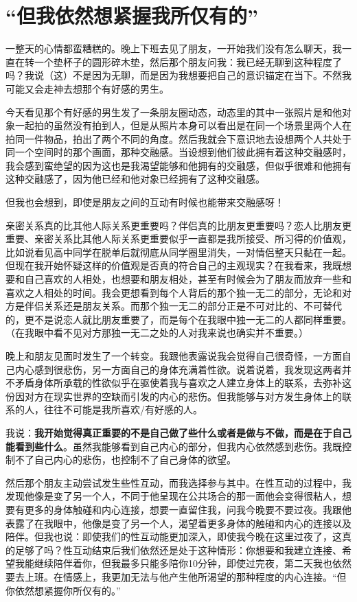 \chapter{“但我​依然想紧握我所仅有的”}






一整天的心情都蛮糟糕的。晚上下班去见了朋友，一开始我们没有怎么聊天，我一直在转一个垫杯子的圆形碎木垫，然后那个朋友问我：我已经无聊到这种程度了吗？我说（这）不是因为无聊，而是因为我想要把自己的意识锚定在当下。不然我可能又会走神去想那个有好感的男生。

今天看见那个有好感的男生发了一条朋友圈动态，动态里的其中一张照片是和他对象一起拍的\pozhehao{}虽然没有拍到人，但是从照片本身可以看出是在同一个场景里两个人在拍同一件物品，拍出了两个不同的角度。然后我就会下意识地去设想两个人共处于同一个空间时的那个画面，那种交融感。当设想到他们彼此拥有着这种交融感时，我会感到蛮绝望的\pozhehao{}因为这也是我渴望能够和他拥有的交融感，但似乎很难和他拥有这种交融感了，因为他已经和他对象已经拥有了这种交融感。

但我也会想到，即使是朋友之间的互动有时候也能带来交融感呀！

亲密关系真的比其他人际关系更重要吗？伴侣真的比朋友更重要吗？恋人比朋友更重要、亲密关系比其他人际关系更重要似乎一直都是我所接受、所习得的价值观，比如说看见高中同学在脱单后就彻底从同学圈里消失，一对情侣整天只黏在一起。但现在我开始怀疑这样的价值观是否真的符合自己的主观现实？在我看来，我既想要和自己喜欢的人相处，也想要和朋友相处，甚至有时候会为了朋友而放弃一些和喜欢之人相处的时间。我会更想看到每个人背后的那个独一无二的部分，无论和对方是伴侣关系还是朋友关系。而那个独一无二的部分正是不可对比的、不可替代的，更不是说恋人就比朋友重要了，而是每个在我眼中独一无二的人都同样重要。（在我眼中看不见对方那独一无二之处的人对我来说也确实并不重要。）

晚上和朋友见面时发生了一个转变。我跟他表露说我会觉得自己很奇怪，一方面自己内心感到很悲伤，另一方面自己的身体充满着性欲。说着说着，我发现这两者并不矛盾\pozhehao{}身体所承载的性欲似乎在驱使着我与喜欢之人建立身体上的联系，去弥补这份因对方在现实世界的空缺而引发的内心的悲伤。但我能够与对方发生身体上的联系的人，往往不可能是我所喜欢/有好感的人。

我说：\textbf{我开始觉得真正重要的不是自己做了些什么或者是做与不做，而是在于自己能看到些什么}。虽然我能够看到自己内心的部分，但我内心依然感到悲伤。我既控制不了自己内心的悲伤，也控制不了自己身体的欲望。

然后那个朋友主动尝试发生些性互动，而我选择参与其中。在性互动的过程中，我发现他像是变了另一个人，不同于他呈现在公共场合的那一面\pozhehao{}他会变得很粘人，想要有更多的身体触碰和内心连接，想要一直留住我，问我今晚要不要过夜。我跟他表露了在我眼中，他像是变了另一个人，渴望着更多身体的触碰和内心的连接以及陪伴。但我也说：即使我们的性互动能更加深入，即使我今晚在这里过夜了，这真的足够了吗？性互动结束后我们依然还是处于这种情形：你想要和我建立连接、希望我能继续陪伴着你，但我最多只能多陪你10分钟，即使过完夜，第二天我也依然要去上班。在情感上，我更加无法与他产生他所渴望的那种程度的内心连接。“但你依然想紧握你所仅有的。”

